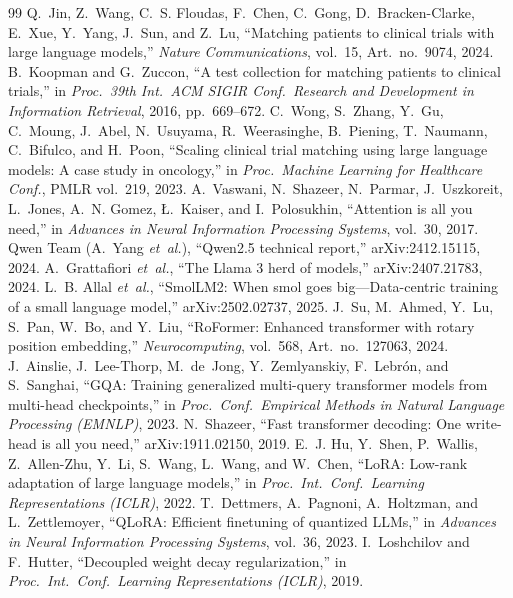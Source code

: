 \documentclass[conference]{IEEEtran}
\begin{document}
\begin{thebibliography}{99}
 Q.~Jin, Z.~Wang, C.~S. Floudas, F.~Chen, C.~Gong, D.~Bracken-Clarke, E.~Xue, Y.~Yang, J.~Sun, and Z.~Lu, ``Matching patients to clinical trials with large language models,'' \emph{Nature Communications}, vol.~15, Art.~no.~9074, 2024.
 B.~Koopman and G.~Zuccon, ``A test collection for matching patients to clinical trials,'' in \emph{Proc.\ 39th Int.\ ACM SIGIR Conf.\ Research and Development in Information Retrieval}, 2016, pp.~669--672.
 C.~Wong, S.~Zhang, Y.~Gu, C.~Moung, J.~Abel, N.~Usuyama, R.~Weerasinghe, B.~Piening, T.~Naumann, C.~Bifulco, and H.~Poon, ``Scaling clinical trial matching using large language models: A case study in oncology,'' in \emph{Proc.\ Machine Learning for Healthcare Conf.}, PMLR vol.~219, 2023.
 A.~Vaswani, N.~Shazeer, N.~Parmar, J.~Uszkoreit, L.~Jones, A.~N. Gomez, {\L}.~Kaiser, and I.~Polosukhin, ``Attention is all you need,'' in \emph{Advances in Neural Information Processing Systems}, vol.~30, 2017.
 Qwen Team (A.~Yang \emph{et~al.}), ``Qwen2.5 technical report,'' arXiv:2412.15115, 2024.
 A.~Grattafiori \emph{et~al.}, ``The Llama 3 herd of models,'' arXiv:2407.21783, 2024.
 L.~B. Allal \emph{et~al.}, ``SmolLM2: When smol goes big---Data-centric training of a small language model,'' arXiv:2502.02737, 2025.
 J.~Su, M.~Ahmed, Y.~Lu, S.~Pan, W.~Bo, and Y.~Liu, ``RoFormer: Enhanced transformer with rotary position embedding,'' \emph{Neurocomputing}, vol.~568, Art.~no.~127063, 2024.
 J.~Ainslie, J.~Lee-Thorp, M.~de~Jong, Y.~Zemlyanskiy, F.~Lebr{\'o}n, and S.~Sanghai, ``GQA: Training generalized multi-query transformer models from multi-head checkpoints,'' in \emph{Proc.\ Conf.\ Empirical Methods in Natural Language Processing (EMNLP)}, 2023.
 N.~Shazeer, ``Fast transformer decoding: One write-head is all you need,'' arXiv:1911.02150, 2019.
 E.~J. Hu, Y.~Shen, P.~Wallis, Z.~Allen-Zhu, Y.~Li, S.~Wang, L.~Wang, and W.~Chen, ``LoRA: Low-rank adaptation of large language models,'' in \emph{Proc.\ Int.\ Conf.\ Learning Representations (ICLR)}, 2022.
 T.~Dettmers, A.~Pagnoni, A.~Holtzman, and L.~Zettlemoyer, ``QLoRA: Efficient finetuning of quantized LLMs,'' in \emph{Advances in Neural Information Processing Systems}, vol.~36, 2023.
 I.~Loshchilov and F.~Hutter, ``Decoupled weight decay regularization,'' in \emph{Proc.\ Int.\ Conf.\ Learning Representations (ICLR)}, 2019.

\end{thebibliography}
\end{document}

